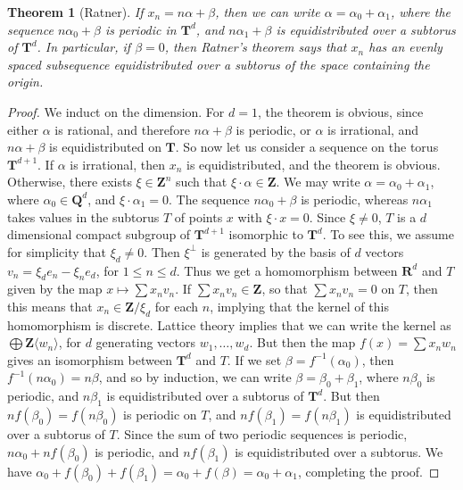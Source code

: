 \documentclass{report}
\theoremstyle{plain}
\theoremstyle{plain}
\newtheorem{theorem}{Theorem}
\begin{document}
\begin{theorem}[Ratner]
    If $x_n = n \alpha + \beta$, then we can write $\alpha = \alpha_0 + \alpha_1$, where the sequence $n \alpha_0 + \beta$ is periodic in $\mathbf{T}^d$, and $n \alpha_1 + \beta$ is equidistributed over a subtorus of $\mathbf{T}^d$. In particular, if $\beta = 0$, then Ratner's theorem says that $x_n$ has an evenly spaced subsequence equidistributed over a subtorus of the space containing the origin.
\end{theorem}
\begin{proof}
    We induct on the dimension. For $d = 1$, the theorem is obvious, since either $\alpha$ is rational, and therefore $n \alpha + \beta$ is periodic, or $\alpha$ is irrational, and $n \alpha + \beta$ is equidistributed on $\mathbf{T}$. So now let us consider a sequence on the torus $\mathbf{T}^{d+1}$. If $\alpha$ is irrational, then $x_n$ is equidistributed, and the theorem is obvious. Otherwise, there exists $\xi \in \mathbf{Z}^n$ such that $\xi \cdot \alpha \in \mathbf{Z}$. We may write $\alpha = \alpha_0 + \alpha_1$, where $\alpha_0 \in \mathbf{Q}^d$, and $\xi \cdot \alpha_1 = 0$. The sequence $n\alpha_0 + \beta$ is periodic, whereas $n \alpha_1$ takes values in the subtorus $T$ of points $x$ with $\xi \cdot x = 0$. Since $\xi \neq 0$, $T$ is a $d$ dimensional compact subgroup of $\mathbf{T}^{d+1}$ isomorphic to $\mathbf{T}^d$. To see this, we assume for simplicity that $\xi_d \neq 0$. Then $\xi^\perp$ is generated by the basis of $d$ vectors $v_n = \xi_d e_n - \xi_n e_d$, for $1 \leq n \leq d$. Thus we get a homomorphism between $\mathbf{R}^d$ and $T$ given by the map $x \mapsto \sum x_n v_n$. If $\sum x_n v_n \in \mathbf{Z}$, so that $\sum x_n v_n = 0$ on $T$, then this means that $x_n \in \mathbf{Z}/\xi_d$ for each $n$, implying that the kernel of this homomorphism is discrete. Lattice theory implies that we can write the kernel as $\bigoplus \mathbf{Z} \langle w_n \rangle$, for $d$ generating vectors $w_1, \dots, w_d$. But then the map $f(x) = \sum x_n w_n$ gives an isomorphism between $\mathbf{T}^d$ and $T$. If we set $\beta = f^{-1}(\alpha_0)$, then $f^{-1}(n\alpha_0) = n \beta$, and so by induction, we can write $\beta = \beta_0 + \beta_1$, where $n\beta_0$ is periodic, and $n \beta_1$ is equidistributed over a subtorus of $\mathbf{T}^d$. But then $n f(\beta_0) = f(n \beta_0)$ is periodic on $T$, and $n f(\beta_1) = f(n \beta_1)$ is equidistributed over a subtorus of $T$. Since the sum of two periodic sequences is periodic, $n \alpha_0 + n f(\beta_0)$ is periodic, and $n f(\beta_1)$ is equidistributed over a subtorus. We have $\alpha_0 + f(\beta_0) + f(\beta_1) = \alpha_0 + f(\beta) = \alpha_0 + \alpha_1$, completing the proof.
\end{proof}
\end{document}

